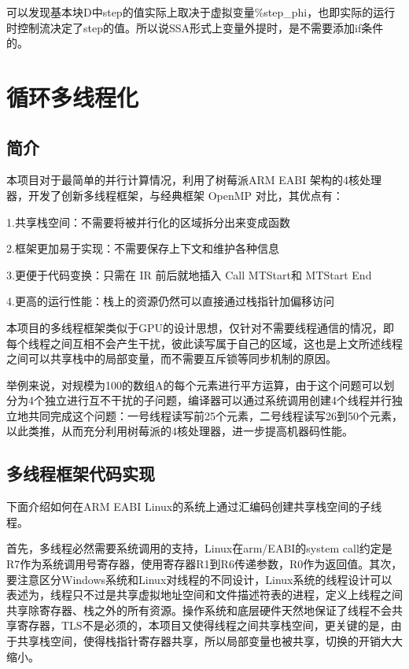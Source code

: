 可以发现基本块D中step的值实际上取决于虚拟变量\%step\_phi，也即实际的运行时控制流决定了step的值。所以说SSA形式上变量外提时，是不需要添加if条件的。


\section{循环多线程化}

\subsection{简介}

本项目对于最简单的并行计算情况，利用了树莓派ARM EABI 架构的4核处理器，开发了创新多线程框架，与经典框架 OpenMP 对比，其优点有：

1.共享栈空间：不需要将被并行化的区域拆分出来变成函数

2.框架更加易于实现：不需要保存上下文和维护各种信息

3.更便于代码变换：只需在 IR 前后就地插入 Call MTStart和 MTStart End

4.更高的运行性能：栈上的资源仍然可以直接通过栈指针加偏移访问

本项目的多线程框架类似于GPU的设计思想，仅针对不需要线程通信的情况，即每个线程之间互相不会产生干扰，彼此读写属于自己的区域，这也是上文所述线程之间可以共享栈中的局部变量，而不需要互斥锁等同步机制的原因。

举例来说，对规模为100的数组A的每个元素进行平方运算，由于这个问题可以划分为4个独立进行互不干扰的子问题，编译器可以通过系统调用创建4个线程并行独立地共同完成这个问题：一号线程读写前25个元素，二号线程读写26到50个元素，以此类推，从而充分利用树莓派的4核处理器，进一步提高机器码性能。

\subsection{多线程框架代码实现}

下面介绍如何在ARM EABI Linux的系统上通过汇编码创建共享栈空间的子线程。

首先，多线程必然需要系统调用的支持，Linux在arm/EABI的system call约定是R7作为系统调用号寄存器，使用寄存器R1到R6传递参数，R0作为返回值。其次，要注意区分Windows系统和Linux对线程的不同设计，Linux系统的线程设计可以表述为，线程只不过是共享虚拟地址空间和文件描述符表的进程，定义上线程之间共享除寄存器、栈之外的所有资源。操作系统和底层硬件天然地保证了线程不会共享寄存器，TLS不是必须的，本项目又使得线程之间共享栈空间，更关键的是，由于共享栈空间，使得栈指针寄存器共享，所以局部变量也被共享，切换的开销大大缩小。

